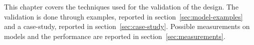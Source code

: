 This chapter covers the techniques used for the validation of the design. The validation is done through examples, reported in section~\ref{sec:model-examples} and a case-study, reported in section~\ref{sec:case-study}. Possible measurements on models and the performance are reported in section~\ref{sec:measurements}.


